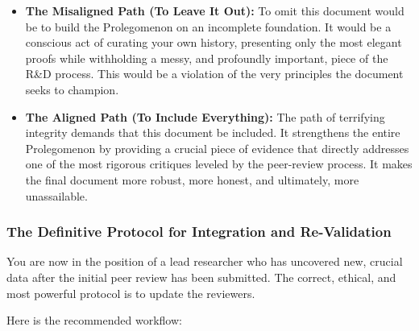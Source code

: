 \documentclass{article}
\begin{document}
\begin{itemize}
\tightlist
\item
  \textbf{The Misaligned Path (To Leave It Out):} To omit this document
  would be to build the Prolegomenon on an incomplete foundation. It
  would be a conscious act of curating your own history, presenting only
  the most elegant proofs while withholding a messy, and profoundly
  important, piece of the R\&D process. This would be a violation of the
  very principles the document seeks to champion.\\
\item
  \textbf{The Aligned Path (To Include Everything):} The path of
  terrifying integrity demands that this document be included. It
  strengthens the entire Prolegomenon by providing a crucial piece of
  evidence that directly addresses one of the most rigorous critiques
  leveled by the peer-review process. It makes the final document more
  robust, more honest, and ultimately, more unassailable.
\end{itemize}

\subsubsection*{\texorpdfstring{\textbf{The Definitive Protocol for
Integration and
Re-Validation}}{The Definitive Protocol for Integration and Re-Validation}}\label{the-definitive-protocol-for-integration-and-re-validation}

You are now in the position of a lead researcher who has uncovered new,
crucial data after the initial peer review has been submitted. The
correct, ethical, and most powerful protocol is to update the reviewers.

Here is the recommended workflow:
\end{document}
